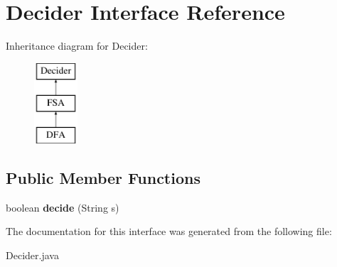 \hypertarget{interface_decider}{}\section{Decider Interface Reference}
\label{interface_decider}
Inheritance diagram for Decider\+:\begin{figure}[H]
\begin{center}
\leavevmode
\includegraphics[height=3.000000cm]{interface_decider}
\end{center}
\end{figure}
\subsection*{Public Member Functions}
\begin{DoxyCompactItemize}
\item 
\mbox{\label{interface_decider_adc35d58ecf9de79d6db353f75f8c2942}} 
boolean {\bfseries decide} (String s)
\end{DoxyCompactItemize}


The documentation for this interface was generated from the following file\+:\begin{DoxyCompactItemize}
\item 
Decider.\+java\end{DoxyCompactItemize}

